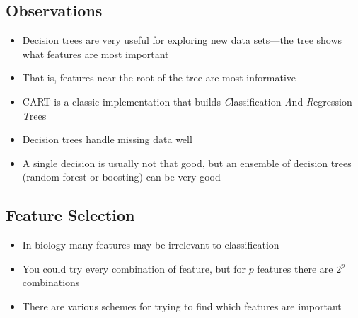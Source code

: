 
\begin{slide}
\section{Observations}

\begin{PauseHighLight}
  \begin{itemize}
  \item Decision trees are very useful for exploring new data
    sets\pause---the tree shows what features are most
    important\pause
  \item That is, features near the root of the tree are most
    informative\pause
  \item CART is a classic implementation that builds
    \emph{C}lassification \emph{A}nd \emph{R}egression
    \emph{T}rees\pause
  \item Decision trees handle missing data well\pause
  \item A single decision is usually not that good, but an ensemble of
    decision trees (random forest or boosting) can be very good\pause
  \end{itemize}
\end{PauseHighLight}

\end{slide}

\Outline %

\begin{slide}
\section{Feature Selection}

\begin{PauseHighLight}
  \begin{itemize}
  \item In biology many features may be irrelevant to
    classification\pause
  \item You could try every combination of feature, but for $p$ features
    there are $2^p$ combinations\pause
  \item There are various schemes for trying to find which features are
    important\pause
  \end{itemize}
\end{PauseHighLight}

\end{slide}


